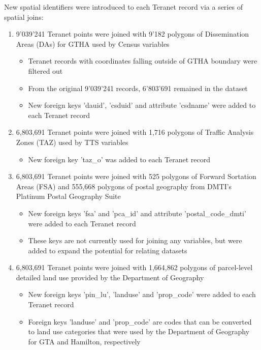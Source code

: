 \vspace{5mm}

New spatial identifiers were introduced to each Teranet record via a series of spatial joins:
\begin{enumerate}
    \item 9'039'241 Teranet points were joined with 9'182 polygons of Dissemination Areas (DAs) for GTHA used by Census variables
    \begin{itemize}
        \item Teranet records with coordinates falling outside of GTHA boundary were filtered out
        \item From the original 9'039'241 records, 6'803'691 remained in the dataset
        \item New foreign keys 'dauid', 'csduid' and attribute 'csdname' were added to each Teranet record
    \end{itemize}
    \item 6,803,691 Teranet points were joined with 1,716 polygons of Traffic Analysis Zones (TAZ) used by TTS variables
    \begin{itemize}
        \item New foreign key 'taz\_o' was added to each Teranet record
    \end{itemize}
    \item 6,803,691 Teranet points were joined with 525 polygons of Forward Sortation Areas (FSA) and 555,668 polygons of postal geography from DMTI's Platinum Postal Geography Suite
    \begin{itemize}
        \item New foreign keys 'fsa' and 'pca\_id' and attribute 'postal\_code\_dmti' were added to each Teranet record
        \item These keys are not currently used for joining any variables, but were added to expand the potential for relating datasets
    \end{itemize}
    \item 6,803,691 Teranet points were joined with 1,664,862 polygons of parcel-level detailed land use provided by the Department of Geography
    \begin{itemize}
        \item New foreign keys 'pin\_lu', 'landuse' and 'prop\_code' were added to each Teranet record
        \item Foreign keys 'landuse' and 'prop\_code' are codes that can be converted to land use categories that were used by the Department of Geography for GTA and Hamilton, respectively

\end{itemize}
\end{enumerate}
